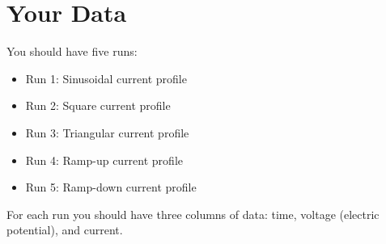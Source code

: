 \section{Your Data}
%
You should have five runs:
\begin{itemize}
	\item Run 1: Sinusoidal current profile
	\item Run 2: Square current profile
	\item Run 3: Triangular current profile
	\item Run 4: Ramp-up current profile
	\item Run 5: Ramp-down current profile
\end{itemize}
For each run you should have three columns of data: time, voltage (electric potential), and current.
%
